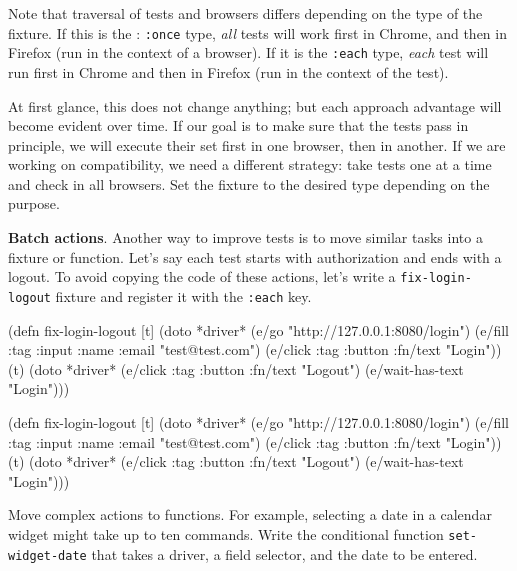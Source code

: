 
Note that traversal of tests and browsers differs depending on the type of the fixture. If this is the : \verb|:once| type, \emph{all} tests will work first in Chrome, and then in Firefox (run in the context of a browser). If it is the \verb|:each| type, \emph{each} test will run first in Chrome and then in Firefox (run in the context of the test).

At first glance, this does not change anything; but each approach advantage will become evident over time. If our goal is to make sure that the tests pass in principle, we will execute their set first in one browser, then in another. If we are working on compatibility, we need a different strategy: take tests one at a time and check in all browsers.  Set the fixture to the desired type depending on the purpose.

\textbf{Batch actions}. Another way to improve tests is to move similar tasks into a fixture or function. Let's say each test starts with authorization and ends with a logout. To avoid copying the code of these actions, let's write a \verb|fix-login-logout| fixture and register it with the \verb|:each| key.

\ifx\DEVICETYPE\MOBILE

\begin{english}
  \begin{clojure}
(defn fix-login-logout [t]
  (doto *driver*
    (e/go "http://127.0.0.1:8080/login")
    (e/fill {:tag :input :name :email}
      "test@test.com")
    (e/click
      {:tag :button :fn/text "Login"}))
  (t)
  (doto *driver*
    (e/click {:tag :button
              :fn/text "Logout"})
    (e/wait-has-text "Login")))
  \end{clojure}
\end{english}

\else

\begin{english}
  \begin{clojure}
(defn fix-login-logout [t]
  (doto *driver*
    (e/go "http://127.0.0.1:8080/login")
    (e/fill {:tag :input
             :name :email} "test@test.com")
    (e/click {:tag :button
              :fn/text "Login"}))
  (t)
  (doto *driver*
    (e/click {:tag :button
              :fn/text "Logout"})
    (e/wait-has-text "Login")))
  \end{clojure}
\end{english}

\fi

Move complex actions to functions. For example, selecting a date in a calendar widget might take up to ten commands. Write the conditional function \verb|set-widget-date| that takes a driver, a field selector, and the date to be entered.

